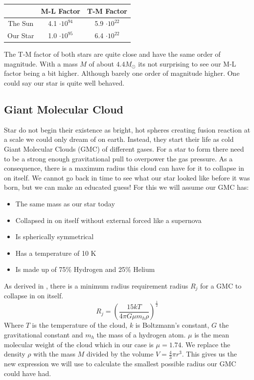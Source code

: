 \documentclass[reprint,english,notitlepage]{revtex4-2}
\begin{document}
\begin{center}
  \begin{tabular}{|c|*{2}{c|}}
    \hline
     &M-L Factor  &T-M Factor  \\
    \hline
    The Sun  &4.1 $ ⋅ 10^{94} $ &5.9 $ ⋅ 10^{22} $ \\
    \hline
    Our Star  &1.0 $ ⋅ 10^{95} $ &6.4 $ ⋅ 10^{22} $ \\
    \hline
    \end{tabular}
\end{center}
The T-M factor of both stars are quite close and have the same order of magnitude. With a mass $ M $ of about $ 4.4 M_{⊙} $ its not surprising to see our M-L factor being a bit higher. Although barely one order of magnitude higher. One could say our star is quite well behaved. 

\subsection{Giant Molecular Cloud}
Star do not begin their existence as bright, hot spheres creating fusion reaction at a scale we could only dream of on earth. Instead, they start their life as cold Giant Molecular Clouds (GMC) of different gases. For a star to form there need to be a strong enough gravitational pull to overpower the gas pressure. As a consequence, there is a maximum radius this cloud can have for it to collapse in on itself. We cannot go back in time to see what our star looked like before it was born, but we can make an educated guess! For this we will assume our GMC has:
\begin{itemize}
  \item The same mass as our star today
  \item Collapsed in on itself without external forced like a supernova
  \item Is spherically symmetrical
  \item Has a temperature of 10 K
  \item Is made up of 75\% Hydrogen and 25\% Helium
\end{itemize} 
As derived in%
, there is a minimum radius requirement radius $ R_j $ for a GMC to collapse in on itself.
\begin{equation}
  R_j = \left( \frac{15kT }{4 π G μ m_h ρ} \right) ^{\frac{1}{2}}
\end{equation}
Where $ T $ is the temperature of the cloud, $ k $ is Boltzmann's constant, $ G $ the gravitational constant and $ m_h $ the mass of a hydrogen atom. $ μ $ is the mean molecular weight of the cloud which in our case is $ μ = 1.74 $. We replace the density $ ρ $ with the mass $ M $ divided by the volume $ V = \frac{4}{3} π r^{3} $. This gives us the new expression we will use to calculate the smallest possible radius our GMC could have had. 
\end{document}
